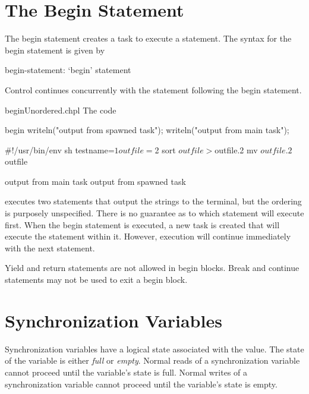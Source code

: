 \section{The Begin Statement}
\label{Begin}

The begin statement creates a task to execute a statement.  The syntax
for the begin statement is given by
\begin{syntax}
begin-statement:
  `begin' statement
\end{syntax}
Control continues concurrently with the statement following the
begin statement.

\begin{chapelexample}{beginUnordered.chpl}
The code
\begin{chapel}
begin writeln("output from spawned task");
writeln("output from main task");
\end{chapel}
\begin{chapelprediff}
\#!/usr/bin/env sh
testname=$1
outfile=$2
sort $outfile > $outfile.2
mv $outfile.2 $outfile
\end{chapelprediff}
\begin{chapeloutput}
output from main task
output from spawned task
\end{chapeloutput}
executes two  statements that output the strings to the
terminal, but the ordering is purposely unspecified.  There is no
guarantee as to which statement will execute first.  When the
begin statement is executed, a new task is created that will execute
the  statement within it.  However, execution will
continue immediately with the next statement.
\end{chapelexample}

Yield and return statements are not allowed in begin blocks.  Break
and continue statements may not be used to exit a begin block.

%
%

\section{Synchronization Variables}
\label{Synchronization_Variables}

Synchronization variables have a logical state associated with the
value.  The state of the variable is either {\em full} or {\em empty}.
Normal reads of a synchronization variable cannot proceed until the
variable's state is full.  Normal writes of a synchronization variable
cannot proceed until the variable's state is empty.


